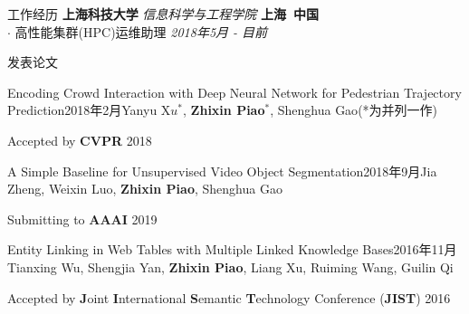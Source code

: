 \documentclass{resume_ch} %
\begin{document}
\begin{rSection}{工作经历}
    {\bf 上海科技大学} {\em 信息科学与工程学院}  \hfill {\bf 上海\ 中国} \\
    $\cdot$ 高性能集群(HPC)运维助理 \hfill {\em 2018年5月 - 目前}

\end{rSection} 



\begin{rSection}{发表论文}
    \begin{pubSubsection}{Encoding Crowd Interaction with Deep Neural Network for Pedestrian Trajectory Prediction}{2018年2月}{Yanyu X$u^*$, \textbf{Zhixin Piao}$^*$, Shenghua Gao}{(*为并列一作)}
        \item Accepted by \textbf{CVPR} 2018
    \end{pubSubsection} 

    \begin{pubSubsection}{A Simple Baseline for Unsupervised Video Object Segmentation}{2018年9月}{Jia Zheng, Weixin Luo, \textbf{Zhixin Piao}, Shenghua Gao}{}
        \item Submitting to \textbf{AAAI} 2019
    \end{pubSubsection} 
    
    \begin{pubSubsection}{Entity Linking in Web Tables with Multiple Linked Knowledge Bases}{2016年11月}{Tianxing Wu, Shengjia Yan, \textbf{Zhixin Piao}, Liang Xu, Ruiming Wang, Guilin Qi}{}
        \item Accepted by \textbf{J}oint \textbf{I}nternational \textbf{S}emantic \textbf{T}echnology Conference (\textbf{JIST}) 2016
    \end{pubSubsection} 
\end{rSection} 
\end{document}

